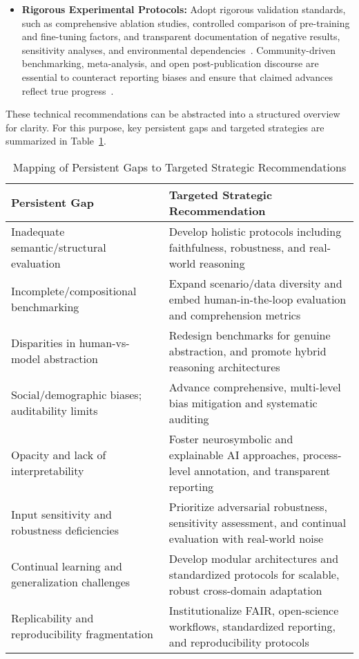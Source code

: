 \documentclass[11pt]{article}
\begin{document}
\begin{itemize}
    \item \textbf{Rigorous Experimental Protocols:} Adopt rigorous validation standards, such as comprehensive ablation studies, controlled comparison of pre-training and fine-tuning factors, and transparent documentation of negative results, sensitivity analyses, and environmental dependencies~\cite{ref9,ref10,ref55,ref59,ref61,ref62,ref66,ref74,ref90,ref104,ref105,ref106,ref107,ref108}. Community-driven benchmarking, meta-analysis, and open post-publication discourse are essential to counteract reporting biases and ensure that claimed advances reflect true progress~\cite{ref22,ref45,ref55,ref61,ref88,ref101,ref106,ref107,ref108}.
\end{itemize}

These technical recommendations can be abstracted into a structured overview for clarity. For this purpose, key persistent gaps and targeted strategies are summarized in Table~\ref{tab:gap_strategy_overview}.

\begin{table}[ht]
\centering
\caption{Mapping of Persistent Gaps to Targeted Strategic Recommendations}
\label{tab:gap_strategy_overview}
\begin{tabular}{|p{4cm}|p{8.5cm}|}
\hline
\textbf{Persistent Gap} & \textbf{Targeted Strategic Recommendation} \\ \hline
Inadequate semantic/structural evaluation & Develop holistic protocols including faithfulness, robustness, and real-world reasoning \\
\hline
Incomplete/compositional benchmarking & Expand scenario/data diversity and embed human-in-the-loop evaluation and comprehension metrics \\
\hline
Disparities in human-vs-model abstraction & Redesign benchmarks for genuine abstraction, and promote hybrid reasoning architectures \\
\hline
Social/demographic biases; auditability limits & Advance comprehensive, multi-level bias mitigation and systematic auditing \\
\hline
Opacity and lack of interpretability & Foster neurosymbolic and explainable AI approaches, process-level annotation, and transparent reporting \\
\hline
Input sensitivity and robustness deficiencies & Prioritize adversarial robustness, sensitivity assessment, and continual evaluation with real-world noise \\
\hline
Continual learning and generalization challenges & Develop modular architectures and standardized protocols for scalable, robust cross-domain adaptation \\
\hline
Replicability and reproducibility fragmentation & Institutionalize FAIR, open-science workflows, standardized reporting, and reproducibility protocols \\
\hline
\end{tabular}
\end{table}
\end{document}
